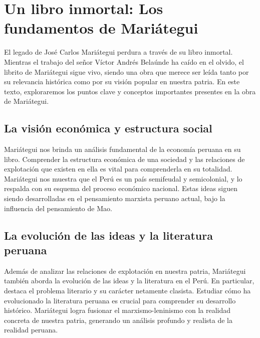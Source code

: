 \documentclass[
  a4paper,
]{article}
\begin{document}
\hypertarget{un-libro-inmortal-los-fundamentos-de-mariuxe1tegui}{%
\section{Un libro inmortal: Los fundamentos de
Mariátegui}\label{un-libro-inmortal-los-fundamentos-de-mariuxe1tegui}}

El legado de José Carlos Mariátegui perdura a través de su libro
inmortal. Mientras el trabajo del señor Víctor Andrés Belaúnde ha caído
en el olvido, el librito de Mariátegui sigue vivo, siendo una obra que
merece ser leída tanto por su relevancia histórica como por su visión
popular en nuestra patria. En este texto, exploraremos los puntos clave
y conceptos importantes presentes en la obra de Mariátegui.

\hypertarget{la-visiuxf3n-econuxf3mica-y-estructura-social}{%
\subsection{La visión económica y estructura
social}\label{la-visiuxf3n-econuxf3mica-y-estructura-social}}

Mariátegui nos brinda un análisis fundamental de la economía peruana en
su libro. Comprender la estructura económica de una sociedad y las
relaciones de explotación que existen en ella es vital para comprenderla
en su totalidad. Mariátegui nos muestra que el Perú es un país
semifeudal y semicolonial, y lo respalda con su esquema del proceso
económico nacional. Estas ideas siguen siendo desarrolladas en el
pensamiento marxista peruano actual, bajo la influencia del pensamiento
de Mao.

\hypertarget{la-evoluciuxf3n-de-las-ideas-y-la-literatura-peruana}{%
\subsection{La evolución de las ideas y la literatura
peruana}\label{la-evoluciuxf3n-de-las-ideas-y-la-literatura-peruana}}

Además de analizar las relaciones de explotación en nuestra patria,
Mariátegui también aborda la evolución de las ideas y la literatura en
el Perú. En particular, destaca el problema literario y su carácter
netamente clasista. Estudiar cómo ha evolucionado la literatura peruana
es crucial para comprender su desarrollo histórico. Mariátegui logra
fusionar el marxismo-leninismo con la realidad concreta de nuestra
patria, generando un análisis profundo y realista de la realidad
peruana.
\end{document}
